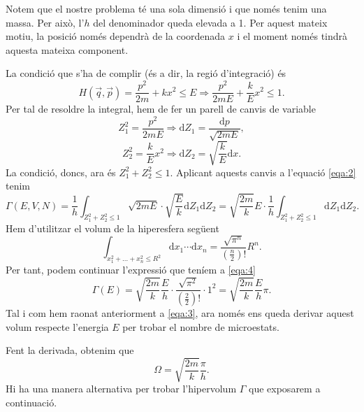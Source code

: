 \documentclass[a4paper, 10pt]{article}
\begin{document}
Notem que el nostre problema té una sola dimensió i que només tenim una massa. Per això, l'$h$ del denominador queda elevada a 1. Per aquest mateix motiu, la posició només dependrà de la coordenada $x$ i el moment només tindrà aquesta mateixa component.

La condició que s'ha de complir (és a dir, la regió d'integració) és
\begin{equation*}
	H\left(\vec{q},\vec{p}\right)=\frac{p^2}{2m}+kx^2\leq E \Rightarrow \frac{p^2}{2mE}+\frac{k}{E}x^2 \leq 1.
\end{equation*}
Per tal de resoldre la integral, hem de fer un parell de canvis de variable
\begin{equation*}
	Z_1^2=\frac{p^2}{2mE} \Rightarrow \mathrm{d}Z_1=\frac{\mathrm{d}p}{\sqrt{2mE}},
\end{equation*}
\begin{equation*}
	Z_2^2=\frac{k}{E}x^2 \Rightarrow \mathrm{d}Z_2=\sqrt{\frac{k}{E}}\mathrm{d}x.
\end{equation*}
La condició, doncs, ara és $Z_1^2+Z_2^2\leq1$.
Aplicant aquests canvis a l'equació \eqref{eqa:2} tenim
\begin{equation}
	\Gamma\left(E,V,N\right)=\frac{1}{h}\int_{Z_1^2+Z_2^2\leq1}\sqrt{2mE}\cdot\sqrt{\frac{E}{k}}\mathrm{d}Z_1\mathrm{d}Z_2=\sqrt{\frac{2m}{k}}E\cdot\frac{1}{h}\int_{Z_1^2+Z_2^2\leq1}\mathrm{d}Z_1\mathrm{d}Z_2.
\label{eqa:4}
\end{equation}
Hem d'utilitzar el volum de la hiperesfera següent
\begin{equation}
	\int_{x_1^2+...+x_n^2\leq R^2} \mathrm{d}x_1 \cdots \mathrm{d}x_n = \frac{\sqrt{\pi^n}}{\left(\frac{n}{2}\right)!}R^n.
\label{eqa:5}
\end{equation}
Per tant, podem continuar l'expressió que teníem a \eqref{eqa:4}
\begin{equation}
	\Gamma\left(E\right)=\sqrt{\frac{2m}{k}}\frac{E}{h}\cdot\frac{\sqrt{\pi^2}}{\left(\frac{2}{2}\right)!}\cdot1^2=\sqrt{\frac{2m}{k}}\frac{E}{h}\pi.
\label{eqa:6}
\end{equation}
Tal i com hem raonat anteriorment a \eqref{eqa:3}, ara només ens queda derivar aquest volum respecte l'energia $E$ per trobar el nombre de microestats.

Fent la derivada, obtenim que
\begin{equation}
	\boxed{\Omega=\sqrt{\frac{2m}{k}}\frac{\pi}{h}}.
\label{eqa:7}
\end{equation}
Hi ha una manera alternativa per trobar l'hipervolum $\Gamma$ que exposarem a continuació.
\end{document}
